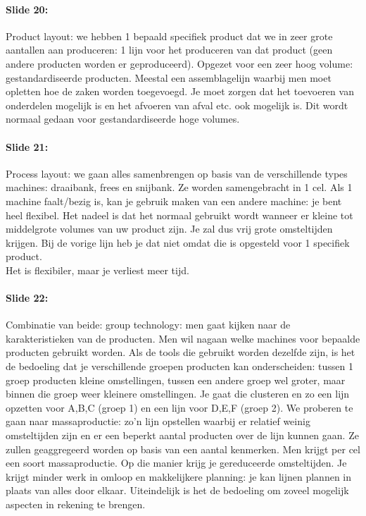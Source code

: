 \documentclass[10pt,a4paper]{report}
\begin{document}
\paragraph{Slide 20:} Product layout: we hebben 1 bepaald specifiek product dat we in zeer grote aantallen aan produceren: 1 lijn voor het produceren van dat product (geen andere producten worden er geproduceerd). Opgezet voor een zeer hoog volume: gestandardiseerde producten. Meestal een assemblagelijn waarbij men moet opletten hoe de zaken worden toegevoegd. Je moet zorgen dat het toevoeren van onderdelen mogelijk is en het afvoeren van afval etc. ook mogelijk is. Dit wordt normaal gedaan voor gestandardiseerde hoge volumes. 

\paragraph{Slide 21:} Process layout: we gaan alles samenbrengen op basis van de verschillende types machines: draaibank, frees en snijbank. Ze worden samengebracht in 1 cel. Als 1 machine faalt/bezig is, kan je gebruik maken van een andere machine: je bent heel flexibel. Het nadeel is dat het normaal gebruikt wordt wanneer er kleine tot middelgrote volumes van uw product zijn. Je zal dus vrij grote omsteltijden krijgen. Bij de vorige lijn heb je dat niet omdat die is opgesteld voor 1 specifiek product.\\
Het is flexibiler, maar je verliest meer tijd.

\paragraph{Slide 22:} Combinatie van beide: group technology: men gaat kijken naar de karakteristieken van de producten. Men wil nagaan welke machines voor bepaalde producten gebruikt worden. Als de tools die gebruikt worden dezelfde zijn, is het de bedoeling dat je verschillende groepen producten kan onderscheiden: tussen 1 groep producten kleine omstellingen, tussen een andere groep wel groter, maar binnen die groep weer kleinere omstellingen. Je gaat die clusteren en zo een lijn opzetten voor A,B,C (groep 1) en een lijn voor D,E,F (groep 2). We proberen te gaan naar massaproductie: zo'n lijn opstellen waarbij er relatief weinig omsteltijden zijn en er een beperkt aantal producten over de lijn kunnen gaan. Ze zullen geaggregeerd worden op basis van een aantal kenmerken.
Men krijgt per cel een soort massaproductie. Op die manier krijg je gereduceerde omsteltijden. Je krijgt minder werk in omloop en makkelijkere planning: je kan lijnen plannen in plaats van alles door elkaar.
Uiteindelijk is het de bedoeling om zoveel mogelijk aspecten in rekening te brengen.
\end{document}
